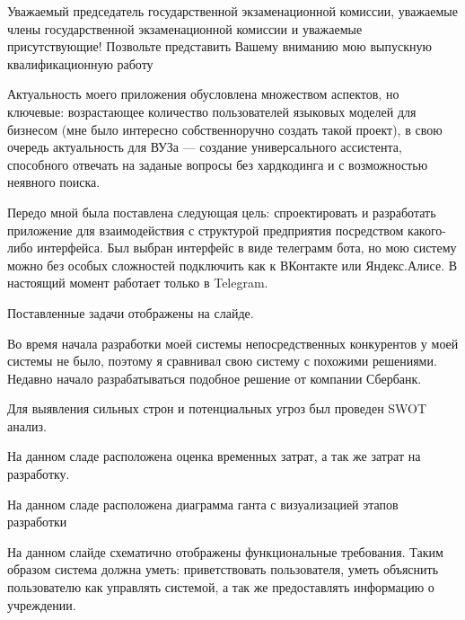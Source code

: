 


Уважаемый председатель государственной экзаменационной комиссии, уважаемые
члены государственной экзаменационной комиссии и уважаемые присутствующие!
Позвольте представить Вашему вниманию мою выпускную квалификационную работу

Актуальность моего приложения обусловлена множеством аспектов, но ключевые:
возрастающее количество пользователей языковых моделей для бизнесом
(мне было интересно собственноручно создать такой проект), в свою очередь
актуальность для ВУЗа --- создание универсального ассистента, способного
отвечать на заданые вопросы без хардкодинга и с возможностью неявного поиска.


Передо мной была поставлена следующая цель: спроектировать и разработать
приложение для взаимодействия с структурой предприятия посредством какого-либо
интерфейса. Был выбран интерфейс в виде телеграмм бота, но мою систему можно
без особых сложностей подключить как к ВКонтакте или Яндекс.Алисе. В настоящий
момент работает только в Telegram.

Поставленные задачи отображены на слайде.


Во время начала разработки моей системы непосредственных конкурентов у 
моей системы не было, поэтому я сравнивал свою систему с похожими решениями.
Недавно начало разрабатываться подобное решение от компании Сбербанк.


Для выявления сильных строн и потенциальных угроз был проведен SWOT анализ.


На данном сладе расположена оценка временных затрат, а так же затрат на
разработку. 


На данном сладе расположена диаграмма ганта с визуализацией этапов разработки


На данном слайде схематично отображены функциональные требования.
Таким образом система должна уметь: приветствовать пользователя, уметь
объяснить пользователю как управлять системой, а так же предоставлять
информацию о учреждении.


